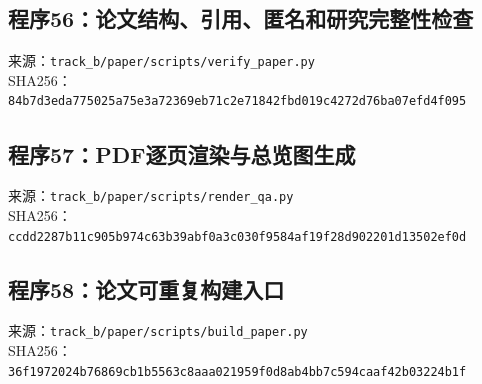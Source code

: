 \subsection*{程序56：论文结构、引用、匿名和研究完整性检查}
\noindent 来源：\nolinkurl{track_b/paper/scripts/verify_paper.py}\\
\noindent SHA256：\texttt{84b7d3eda775025a75e3a72369eb71c2}\allowbreak\texttt{e71842fbd019c4272d76ba07efd4f095}\\
\clearpage
\subsection*{程序57：PDF逐页渲染与总览图生成}
\noindent 来源：\nolinkurl{track_b/paper/scripts/render_qa.py}\\
\noindent SHA256：\texttt{ccdd2287b11c905b974c63b39abf0a3c}\allowbreak\texttt{030f9584af19f28d902201d13502ef0d}\\
\clearpage
\subsection*{程序58：论文可重复构建入口}
\noindent 来源：\nolinkurl{track_b/paper/scripts/build_paper.py}\\
\noindent SHA256：\texttt{36f1972024b76869cb1b5563c8aaa021}\allowbreak\texttt{959f0d8ab4bb7c594caaf42b03224b1f}\\
